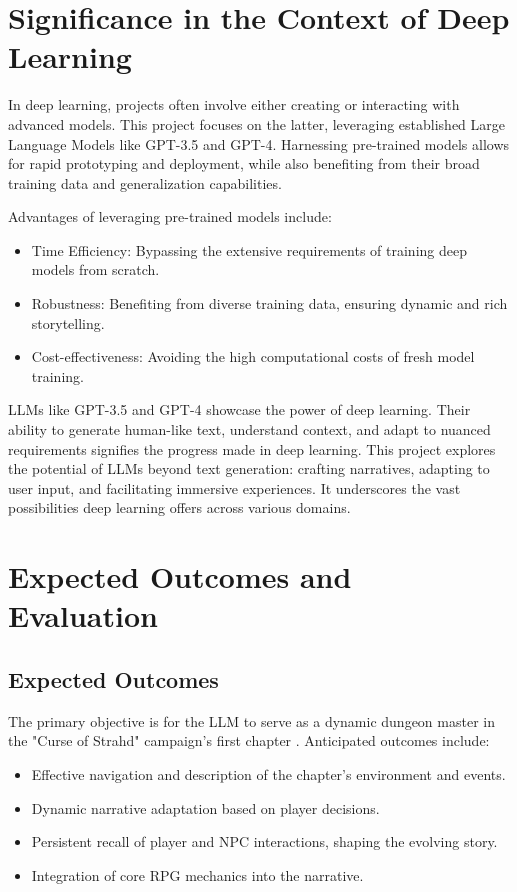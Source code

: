 \documentclass[12pt]{article}
\begin{document}
\section{Significance in the Context of Deep Learning}
In deep learning, projects often involve either creating or interacting with advanced models. This project focuses on the latter, leveraging established Large Language Models like GPT-3.5 and GPT-4. Harnessing pre-trained models allows for rapid prototyping and deployment, while also benefiting from their broad training data and generalization capabilities.

Advantages of leveraging pre-trained models include:

\begin{itemize}
\item Time Efficiency: Bypassing the extensive requirements of training deep models from scratch.
\item Robustness: Benefiting from diverse training data, ensuring dynamic and rich storytelling.
\item Cost-effectiveness: Avoiding the high computational costs of fresh model training.
\end{itemize}

LLMs like GPT-3.5 and GPT-4 showcase the power of deep learning. Their ability to generate human-like text, understand context, and adapt to nuanced requirements signifies the progress made in deep learning. This project explores the potential of LLMs beyond text generation: crafting narratives, adapting to user input, and facilitating immersive experiences. It underscores the vast possibilities deep learning offers across various domains.

\section{Expected Outcomes and Evaluation}

\subsection{Expected Outcomes}

The primary objective is for the LLM to serve as a dynamic dungeon master in the "Curse of Strahd" campaign's first chapter \cite{Perkins2023CurseOfStrahd}. Anticipated outcomes include:

\begin{itemize}
\item Effective navigation and description of the chapter's environment and events.
\item Dynamic narrative adaptation based on player decisions.
\item Persistent recall of player and NPC interactions, shaping the evolving story.
\item Integration of core RPG mechanics into the narrative.
\end{itemize}
\end{document}
